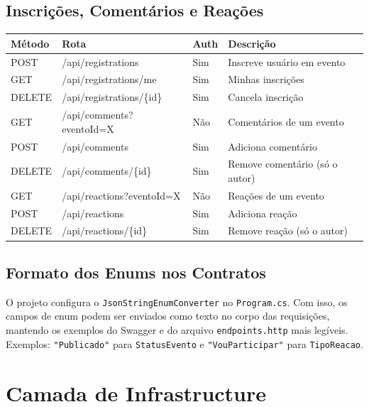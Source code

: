 \documentclass[11pt, a4paper, oneside]{article}
\begin{document}
\subsection{Inscrições, Comentários e Reações}

\begin{longtable}{L{1.5cm} L{5.5cm} L{2cm} L{5cm}}
\toprule
{}
\color{white}\textbf{Método} & \color{white}\textbf{Rota} & \color{white}\textbf{Auth} & \color{white}\textbf{Descrição} \\
\midrule
\endhead
POST & /api/registrations & Sim & Inscreve usuário em evento \\
GET & /api/registrations/me & Sim & Minhas inscrições \\
DELETE & /api/registrations/\{id\} & Sim & Cancela inscrição \\
\midrule
GET & /api/comments?eventoId=X & Não & Comentários de um evento \\
POST & /api/comments & Sim & Adiciona comentário \\
DELETE & /api/comments/\{id\} & Sim & Remove comentário (só o autor) \\
\midrule
GET & /api/reactions?eventoId=X & Não & Reações de um evento \\
POST & /api/reactions & Sim & Adiciona reação \\
DELETE & /api/reactions/\{id\} & Sim & Remove reação (só o autor) \\
\bottomrule
\end{longtable}

\subsection{Formato dos Enums nos Contratos}

O projeto configura o \texttt{JsonStringEnumConverter} no \texttt{Program.cs}. Com isso, os campos de enum podem ser enviados como texto no corpo das requisições, mantendo os exemplos do Swagger e do arquivo \texttt{endpoints.http} mais legíveis. Exemplos: \texttt{"Publicado"} para \texttt{StatusEvento} e \texttt{"VouParticipar"} para \texttt{TipoReacao}.

\section{Camada de Infrastructure}
\end{document}
